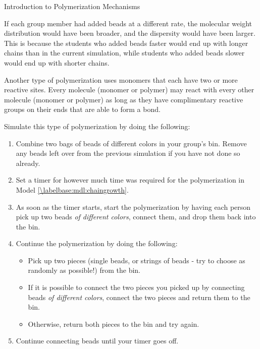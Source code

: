 \begin{activity}{Introduction to Polymerization Mechanisms}
\begin{ctqs}
		\begin{solution}[1.9in]
			If each group member had added beads at a different rate, the molecular weight distribution would have been broader, and the dispersity would have been larger.  This is because the students who added beads faster would end up with longer chains than in the current simulation, while students who added beads slower would end up with shorter chains.
		\end{solution}
		
\end{ctqs}

\begin{model}
\label{\labelbase:mdl:stepgrowth}

	Another type of polymerization uses monomers that each have two or more reactive sites.  Every molecule (monomer or polymer) may react with every other molecule (monomer or polymer) as long as they have complimentary reactive groups on their ends that are able to form a bond.
	
	Simulate this type of polymerization by doing the following:
	\begin{enumerate}
		\item Combine two bags of beads of different colors in your group's bin.  Remove any beads left over from the previous simulation if you have not done so already.
		\item Set a timer for however much time was required for the polymerization in Model \ref{\labelbase:mdl:chaingrowth}.
		\item As soon as the timer starts, start the polymerization by having each person pick up two beads \emph{of different colors}, connect them, and drop them back into the bin.
		\item Continue the polymerization by doing the following:
			\begin{itemize}
				\item Pick up two pieces (single beads, or strings of beads - try to choose as randomly as possible!) from the bin.
				\item If it is possible to connect the two pieces you picked up by connecting beads \emph{of different colors}, connect the two pieces and return them to the bin.
				\item Otherwise, return both pieces to the bin and try again.
			\end{itemize}
		\item Continue connecting beads until your timer goes off.
	\end{enumerate}
	

\end{model}
\end{activity}
